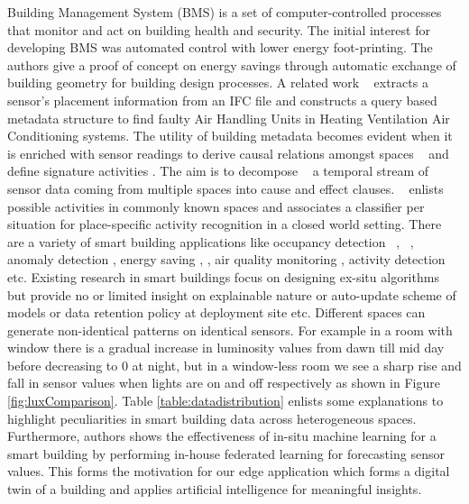 \documentclass[conference]{IEEEtran}
\begin{document}
Building Management System (BMS) \cite{liu2021indoor} is a set of computer-controlled processes that monitor and act on building health and security. The initial interest for developing BMS was automated control with lower energy foot-printing. The authors \cite{bazjanac1999industry} give a proof of concept on  energy savings through automatic exchange of building geometry for building design processes. A related work ~\cite{bhattacharya2016enabling} extracts a sensor's placement information from an IFC file and constructs a query based metadata structure to find faulty Air Handling Units in Heating Ventilation Air Conditioning systems. The utility of building metadata becomes evident when it is enriched \cite{roth2014open} \cite{balaji2018brick} with sensor readings to derive causal relations amongst spaces ~\cite{cook2003mavhome} and define signature activities \cite{stavropoulos2012bonsai}. The aim is to decompose ~\cite{cook2003mavhome} a temporal stream of sensor data coming from multiple spaces into cause and effect clauses. ~\cite{cumin2017human} enlists possible activities in commonly known spaces and associates a classifier per situation for place-specific activity recognition in a closed world setting. There are a variety of smart building applications like occupancy detection ~\cite{garg2000smart}, ~\cite{ai2014occupancy}, anomaly detection \cite{capozzoli2018automated}, energy saving \cite{mitra2016economical}, \cite{ostadijafari2020linearized}, air quality monitoring \cite{dong2019review}, activity detection ~\cite{dong2009sensor} etc. Existing research in smart buildings focus on designing ex-situ algorithms but provide no or limited insight on explainable nature or auto-update scheme of models or data retention policy at deployment site etc. Different spaces can generate non-identical patterns on identical sensors. For example in a room with window there is a gradual increase in luminosity values from dawn till mid day before decreasing to 0 at night, but in a window-less room we see a sharp rise and fall in sensor values when lights are on and off respectively as shown in Figure \ref{fig:luxComparison}. Table \ref{table:datadistribution} enlists some explanations to highlight peculiarities in smart building data across heterogeneous spaces. Furthermore, authors \cite{mitra2021impact} shows the effectiveness of in-situ machine learning for a smart building by performing in-house federated learning for forecasting sensor values. This forms the motivation for our edge application which forms a digital twin of a building and applies artificial intelligence for meaningful insights. 
\end{document}
